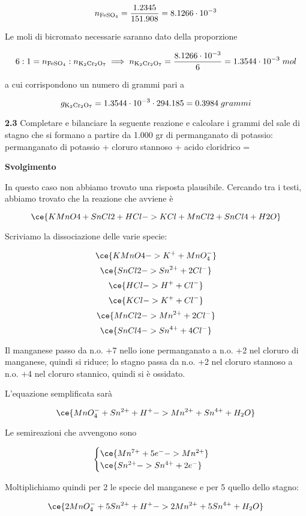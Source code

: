 $$n_{\rm FeSO_4}=\frac{1.2345}{151.908}=8.1266 \cdot 10^{-3}$$

Le moli di bicromato necessarie saranno dato della proporzione

$$6:1=n_{\rm FeSO_4}:n_{\rm K_2Cr_2O_7}
\implies
n_{\rm K_2Cr_2O_7}
=\frac{8.1266 \cdot 10^{-3}}{6}
=1.3544 \cdot 10^{-3}\;mol$$

a cui corrispondono un numero di grammi pari a

$$g_{\rm K_2Cr_2O_7}
=1.3544 \cdot 10^{-3} \cdot 294.185
=0.3984\;grammi$$

\vspace{0.2cm}\textbf{2.3} Completare e bilanciare la seguente reazione e calcolare i grammi del sale di stagno che si formano a partire da 1.000 gr di permanganato di potassio: 
permanganato di potassio + cloruro stannoso + acido cloridrico =

\vspace{0.2cm}\large\textbf{Svolgimento}\normalsize

\vspace{0.2cm}In questo caso non abbiamo trovato una risposta plausibile. Cercando tra i testi, abbiamo trovato che la reazione che avviene è

$$\ce{KMnO4 + SnCl2 + HCl -> KCl + MnCl2 + SnCl4 + H2O}$$

Scriviamo la dissociazione delle varie specie:

$$\ce{KMnO4 -> K^+ + MnO_4^-}$$
$$\ce{SnCl2 -> Sn^{2+} + 2Cl^-}$$
$$\ce{HCl -> H^+ + Cl^-}$$
$$\ce{KCl -> K^+ + Cl^-}$$
$$\ce{MnCl2 -> Mn^{2+} + 2Cl^-}$$
$$\ce{SnCl4 -> Sn^{4+} + 4Cl^-}$$

Il manganese passo da n.o. +7 nello ione permanganato a n.o. +2 nel cloruro di
manganese, quindi si riduce; lo stagno passa da n.o. +2 nel cloruro stannoso a n.o. +4 nel cloruro stannico, quindi si è ossidato.

L'equazione semplificata sarà

$$\ce{MnO_4^- + Sn^{2+} + H^+ -> Mn^{2+} + Sn^{4+} + H_2O}$$

Le semireazioni che avvengono sono

$$\begin{cases}
    \ce{Mn^{7+} + 5e^- -> Mn^{2+}}\\
    \ce{Sn^{2+} -> Sn^{4+} + 2e^-}
\end{cases}$$

Moltiplichiamo quindi per 2 le specie del manganese e per 5 quello dello stagno:

$$\ce{2MnO_4^- + 5Sn^{2+} + H^+ -> 2Mn^{2+} + 5Sn^{4+} + H_2O}$$


